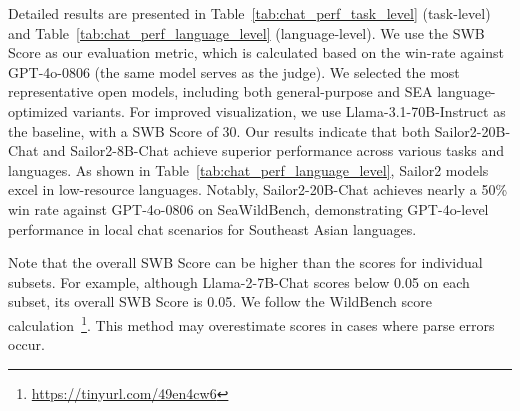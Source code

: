 Detailed results are presented in Table~\ref{tab:chat_perf_task_level} (task-level) and Table~\ref{tab:chat_perf_language_level} (language-level). We use the SWB Score as our evaluation metric, which is calculated based on the win-rate against GPT-4o-0806 (the same model serves as the judge). We selected the most representative open models, including both general-purpose and SEA language-optimized variants. For improved visualization, we use Llama-3.1-70B-Instruct as the baseline, with a SWB Score of 30. Our results indicate that both Sailor2-20B-Chat and Sailor2-8B-Chat achieve superior performance across various tasks and languages. 
As shown in Table~\ref{tab:chat_perf_language_level}, Sailor2 models excel in low-resource languages. Notably, Sailor2-20B-Chat achieves nearly a 50\% win rate against GPT-4o-0806 on SeaWildBench, demonstrating GPT-4o-level performance in local chat scenarios for Southeast Asian languages.


Note that the overall SWB Score can be higher than the scores for individual subsets. For example, although Llama-2-7B-Chat scores below 0.05 on each subset, its overall SWB Score is 0.05. 
We follow the WildBench score calculation~\footnote{\url{https://tinyurl.com/49en4cw6}}.
This method may overestimate scores in cases where parse errors occur.





